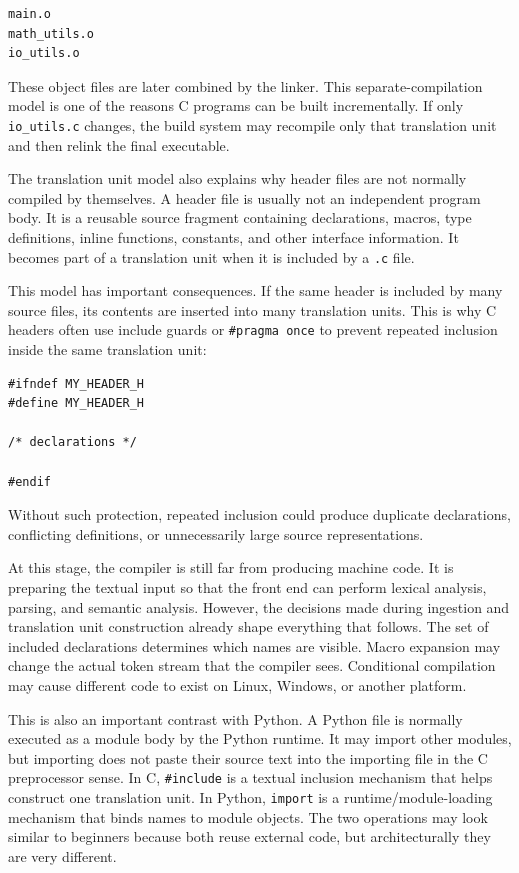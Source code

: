\begin{verbatim}
main.o
math_utils.o
io_utils.o
\end{verbatim}

These object files are later combined by the linker. This separate-compilation model is one of the reasons C programs can be built incrementally. If only \texttt{io\_utils.c} changes, the build system may recompile only that translation unit and then relink the final executable.

The translation unit model also explains why header files are not normally compiled by themselves. A header file is usually not an independent program body. It is a reusable source fragment containing declarations, macros, type definitions, inline functions, constants, and other interface information. It becomes part of a translation unit when it is included by a \texttt{.c} file.

This model has important consequences. If the same header is included by many source files, its contents are inserted into many translation units. This is why C headers often use include guards or \texttt{\#pragma once} to prevent repeated inclusion inside the same translation unit:

\begin{verbatim}
#ifndef MY_HEADER_H
#define MY_HEADER_H

/* declarations */

#endif
\end{verbatim}

Without such protection, repeated inclusion could produce duplicate declarations, conflicting definitions, or unnecessarily large source representations.

At this stage, the compiler is still far from producing machine code. It is preparing the textual input so that the front end can perform lexical analysis, parsing, and semantic analysis. However, the decisions made during ingestion and translation unit construction already shape everything that follows. The set of included declarations determines which names are visible. Macro expansion may change the actual token stream that the compiler sees. Conditional compilation may cause different code to exist on Linux, Windows, or another platform.

This is also an important contrast with Python. A Python file is normally executed as a module body by the Python runtime. It may import other modules, but importing does not paste their source text into the importing file in the C preprocessor sense. In C, \texttt{\#include} is a textual inclusion mechanism that helps construct one translation unit. In Python, \texttt{import} is a runtime/module-loading mechanism that binds names to module objects. The two operations may look similar to beginners because both reuse external code, but architecturally they are very different.

